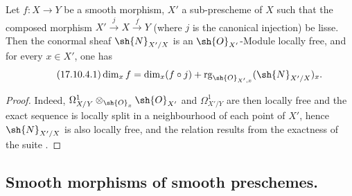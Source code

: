 \begin{corollary}[17.10.4]
\label{IV.17.10.4}
Let $f:X\to Y$ be a smooth morphism, $X'$ a sub-prescheme of $X$ such that the composed morphism $X'\xrightarrow{j}X\xrightarrow{f}Y$ (where $j$ is the canonical injection) be lisse.
Then the conormal sheaf $\sh{N}_{X'/X}$ is an $\sh{O}_{X'}$-Module locally free, and for every $x\in X'$, one has
\begin{equation}
\label{IV.17.10.4.1}
\tag{17.10.4.1}
  \dim_x f = \dim_x(f\circ j) + \operatorname{rg}_{\sh{O}_{X',x}}(\sh{N}_{X'/X})_x.
\end{equation}
\end{corollary}

\begin{proof}
Indeed, $\Omega^1_{X/Y}\otimes_{\sh{O}_x} \sh{O}_{X'}$ and $\Omega^1_{X'/Y}$ are then locally free and the exact sequence  is locally split in a neighbourhood of each point of $X'$, hence $\sh{N}_{X'/X}$ is also locally free, and the relation  results from the exactness of the suite .
\end{proof}


\subsection{Smooth morphisms of smooth preschemes.}
\label{subsection:IV.17.11}

